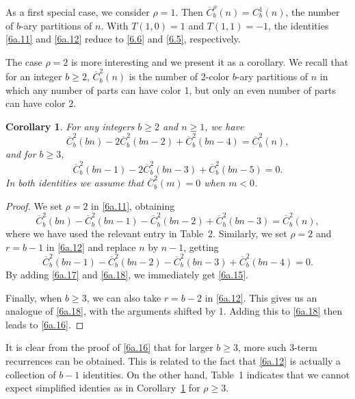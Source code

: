 \documentclass{amsart}
\theoremstyle{plain}
\newtheorem{corollary}[theorem]{Corollary}
\numberwithin{equation}{section}
\begin{document}
As a first special case, we consider $\rho=1$. Then 
$\overline{C}_b^\rho(n)=C_b^1(n)$, the number of $b$-ary partitions of $n$.
With $T(1,0)=1$ and $T(1,1)=-1$, the identities \eqref{6a.11} and \eqref{6a.12}
reduce to \eqref{6.6} and \eqref{6.5}, respectively.

The case $\rho=2$ is more interesting and we present it as a corollary. 
We recall that for an integer $b\geq 2$, $\overline{C}_b^2(n)$ is the number of
2-color $b$-ary partitions of $n$ in which any number of parts can have color 1,
but only an even number of parts can have color 2.

\begin{corollary}\label{cor:6.16}
For any integers $b\geq 2$ and $n\geq 1$, we have
\begin{equation}\label{6a.15}
\overline{C}_b^2(bn)-2\overline{C}_b^2(bn-2)+\overline{C}_b^2(bn-4)
=\overline{C}_b^2(n),
\end{equation}
and for $b\geq 3$,
\begin{equation}\label{6a.16}
\overline{C}_b^2(bn-1)-2\overline{C}_b^2(bn-3)+\overline{C}_b^2(bn-5) = 0.
\end{equation}
In both identities we assume that $\overline{C}_b^2(m)=0$ when $m<0$.
\end{corollary}

\begin{proof}
We set $\rho=2$ in \eqref{6a.11}, obtaining
\begin{equation}\label{6a.17}
\overline{C}_b^2(bn)-\overline{C}_b^2(bn-1)-\overline{C}_b^2(bn-2)
+\overline{C}_b^2(bn-3)=\overline{C}_b^2(n),
\end{equation}
where we have used the relevant entry in Table~2. Similarly, we set $\rho=2$
and $r=b-1$ in \eqref{6a.12} and replace $n$ by $n-1$, getting
\begin{equation}\label{6a.18}
\overline{C}_b^2(bn-1)-\overline{C}_b^2(bn-2)-\overline{C}_b^2(bn-3)
+\overline{C}_b^2(bn-4)=0.
\end{equation}
By adding \eqref{6a.17} and \eqref{6a.18}, we immediately get \eqref{6a.15}. 

Finally, when $b\geq 3$, we can also take $r=b-2$ in \eqref{6a.12}. This gives
us an analogue of \eqref{6a.18}, with the arguments shifted by 1. Adding this
to \eqref{6a.18} then leads to \eqref{6a.16}.
\end{proof}

It is clear from the proof of \eqref{6a.16} that for larger $b\geq 3$, more
such 3-term recurrences can be obtained. This is related to the fact that 
\eqref{6a.12} is actually a collection of $b-1$ identities. On the other hand,
Table~1 indicates that we cannot expect simplified identies as in 
Corollary~\ref{cor:6.16} for $\rho\geq 3$.
\end{document}
